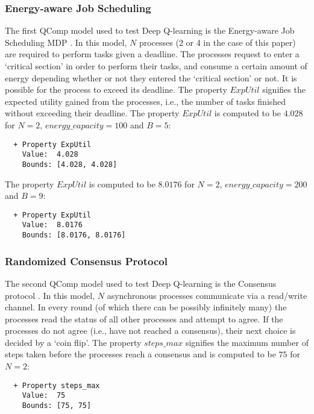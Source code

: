 \subsubsection{Energy-aware Job Scheduling}

The first QComp model used to test Deep Q-learning is the Energy-aware Job Scheduling MDP \cite{eajs}. In this model, $N$ processes (2 or 4 in the case of this paper) are required to perform tasks given a deadline. The processes request to enter a `critical section' in order to perform their tasks, and consume a certain amount of energy depending whether or not they entered the `critical section' or not. It is possible for the process to exceed its deadline. The property $ExpUtil$ signifies the expected utility gained from the processes, i.e., the number of tasks finished without exceeding their deadline. The property $ExpUtil$ is computed to be $4.028$ for $N = 2$, $energy\_capacity = 100$ and $B = 5$:

\begin{verbatim}
  + Property ExpUtil
    Value:  4.028
    Bounds: [4.028, 4.028]
\end{verbatim}

The property $ExpUtil$ is computed to be $8.0176$ for $N = 2$, $energy\_capacity = 200$ and $B = 9$:

\begin{verbatim}
  + Property ExpUtil
    Value:  8.0176
    Bounds: [8.0176, 8.0176]
\end{verbatim}

\subsubsection{Randomized Consensus Protocol}

The second QComp model used to test Deep Q-learning is the Consensus protocol \cite{consensus}. In this model, $N$ asynchronous processes communicate via a read/write channel. In every round (of which there can be possibly infinitely many) the processes read the status of all other processes and attempt to agree. If the processes do not agree (i.e., have not reached a consensus), their next choice is decided by a `coin flip'. The property $steps\_max$ signifies the maximum number of steps taken before the processes reach a consensus and is computed to be $75$ for $N = 2$:

\begin{verbatim}
  + Property steps_max
    Value:  75
    Bounds: [75, 75]
\end{verbatim}
